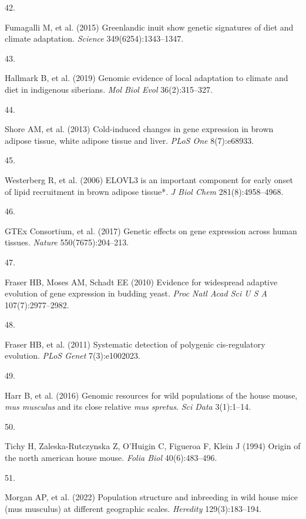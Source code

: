 \documentclass[9pt,twocolumn,twoside,lineno]{pnas-new}
\newlength{\cslhangindent}
\newlength{\csllabelwidth}
\newlength{\cslentryspacingunit} %
\newenvironment{CSLReferences}[2] %
 {%
  \setlength{\parindent}{0pt}
  \ifodd #1
  \let\oldpar\par
  \def\par{\hangindent=\cslhangindent\oldpar}
  \fi
  \setlength{\parskip}{#2\cslentryspacingunit}
 }%
 {}
\newcommand{\CSLLeftMargin}[1]{\parbox[t]{\csllabelwidth}{#1}}
\newcommand{\CSLRightInline}[1]{\parbox[t]{\linewidth - \csllabelwidth}{#1}\break}
\begin{document}
\begin{CSLReferences}{0}{0}
\leavevmode\hypertarget{ref-Fumagalli2015}{}%
\CSLLeftMargin{42. }
\CSLRightInline{Fumagalli M, et al. (2015) Greenlandic inuit show
genetic signatures of diet and climate adaptation. \emph{Science}
349(6254):1343--1347.}

\leavevmode\hypertarget{ref-Hallmark2019}{}%
\CSLLeftMargin{43. }
\CSLRightInline{Hallmark B, et al. (2019) Genomic evidence of local
adaptation to climate and diet in indigenous siberians. \emph{Mol Biol
Evol} 36(2):315--327.}

\leavevmode\hypertarget{ref-Shore2013}{}%
\CSLLeftMargin{44. }
\CSLRightInline{Shore AM, et al. (2013) Cold-induced changes in gene
expression in brown adipose tissue, white adipose tissue and liver.
\emph{PLoS One} 8(7):e68933.}

\leavevmode\hypertarget{ref-Westerberg2006}{}%
\CSLLeftMargin{45. }
\CSLRightInline{Westerberg R, et al. (2006) {ELOVL3} is an important
component for early onset of lipid recruitment in brown adipose tissue*.
\emph{J Biol Chem} 281(8):4958--4968.}

\leavevmode\hypertarget{ref-GTEx_Consortium2017}{}%
\CSLLeftMargin{46. }
\CSLRightInline{GTEx Consortium, et al. (2017) Genetic effects on gene
expression across human tissues. \emph{Nature} 550(7675):204--213.}

\leavevmode\hypertarget{ref-Fraser2010}{}%
\CSLLeftMargin{47. }
\CSLRightInline{Fraser HB, Moses AM, Schadt EE (2010) Evidence for
widespread adaptive evolution of gene expression in budding yeast.
\emph{Proc Natl Acad Sci U S A} 107(7):2977--2982.}

\leavevmode\hypertarget{ref-Fraser2011}{}%
\CSLLeftMargin{48. }
\CSLRightInline{Fraser HB, et al. (2011) Systematic detection of
polygenic cis-regulatory evolution. \emph{PLoS Genet} 7(3):e1002023.}

\leavevmode\hypertarget{ref-Harr2016}{}%
\CSLLeftMargin{49. }
\CSLRightInline{Harr B, et al. (2016) Genomic resources for wild
populations of the house mouse, \emph{mus musculus} and its close
relative \emph{mus spretus}. \emph{Sci Data} 3(1):1--14.}

\leavevmode\hypertarget{ref-Tichy1994}{}%
\CSLLeftMargin{50. }
\CSLRightInline{Tichy H, Zaleska-Rutczynska Z, O'Huigin C, Figueroa F,
Klein J (1994) Origin of the north american house mouse. \emph{Folia
Biol} 40(6):483--496.}

\leavevmode\hypertarget{ref-Morgan2022}{}%
\CSLLeftMargin{51. }
\CSLRightInline{Morgan AP, et al. (2022) Population structure and
inbreeding in wild house mice (mus musculus) at different geographic
scales. \emph{Heredity} 129(3):183--194.}


\end{CSLReferences}
\end{document}
